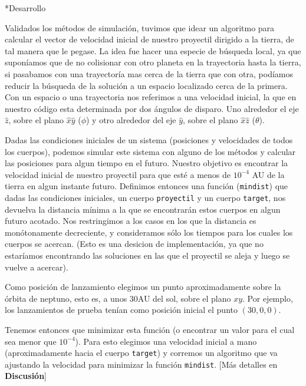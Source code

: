 \documentclass[12pt,titlepage]{article}
\newenvironment{usection}[1]{\newpage\begin{section}*{#1}	\addcontentsline{toc}{section}{#1}}{\end{section}}
\begin{document}
\begin{usection}{Desarrollo}
		Validados los métodos de simulación, tuvimos que idear un
		algoritmo para calcular el vector de velocidad inicial de
		nuestro proyectil dirigido a la tierra, de tal manera que le pegase.
		La idea fue hacer una especie de búsqueda local, ya que
		suponíamos que de no colisionar con otro planeta en la
		trayectoria hasta la tierra, si pasabamos con una trayectoría
		mas cerca de la tierra que con otra, podíamos reducir la
		búsqueda de la solución a un espacio localizado cerca de la
		primera. Con un espacio o una trayectoria nos referimos a una
		velocidad inicial, la que en nuestro código esta determinada por
		dos ángulos de disparo. Uno alrededor el eje $\hat{z}$, sobre el
		plano $\hat{x}\hat{y}$ ($\phi$) y otro alrededor del eje $\hat{y}$, sobre
		el plano $\hat{x}\hat{z}$ ($\theta$).
		
		Dadas las condiciones iniciales de un sistema (posiciones y velocidades de todos los cuerpos), podemos simular este sistema con alguno de los métodos y calcular las posiciones para algun tiempo en el futuro.
		Nuestro objetivo es encontrar la velocidad inicial de nuestro proyectil para que esté a menos de $10^{-4}$ AU de la tierra en algun instante futuro.
		Definimos entonces una función (\texttt{mindist}) que dadas las condiciones iniciales, un cuerpo \texttt{proyectil} y un cuerpo \texttt{target}, nos devuelva la distancia mínima a la que se encontrarán estos cuerpos en algun futuro acotado.
		Nos restringimos a los casos en los que la distancia es monótonamente decreciente, y consideramos sólo los tiempos para los cuales los cuerpos se acercan. (Esto es una desicion de implementación, ya que no estaríamos encontrando las soluciones en las que el proyectil se aleja y luego se vuelve a acercar).
		
		Como posición de lanzamiento elegimos un punto aproximadamente sobre la
		órbita de neptuno, esto es, a unos 30AU del sol, sobre el plano $xy$.
		Por ejemplo, los lanzamientos de prueba tenían como posición inicial el punto $(30,0,0)$.
		
		Tenemos entonces que minimizar esta función (o encontrar un valor para el cual sea menor que $10^{-4}$).
		Para esto elegimos una velocidad inicial a mano (aproximadamente hacia el cuerpo \texttt{target}) y corremos un algoritmo que va ajustando la velocidad para minimizar la función \texttt{mindist}. [Más detalles en \textbf{Discusión}]


\end{usection}
\end{document}
